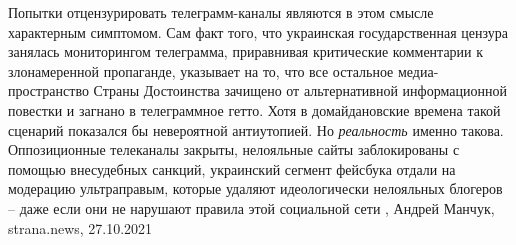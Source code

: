 Попытки отцензурировать телеграмм-каналы являются в этом смысле характерным
симптомом. Сам факт того, что украинская государственная цензура занялась
мониторингом телеграмма, приравнивая критические комментарии к злонамеренной
пропаганде, указывает на то, что все остальное медиа-пространство Страны
Достоинства зачищено от альтернативной информационной повестки и загнано в
телеграммное гетто. Хотя в домайдановские времена такой сценарий показался бы
невероятной антиутопией.  Но \emph{реальность} именно такова. Оппозиционные
телеканалы закрыты, нелояльные сайты заблокированы с помощью внесудебных
санкций, украинский сегмент фейсбука отдали на модерацию ультраправым, которые
удаляют идеологически нелояльных блогеров – даже если они не нарушают правила
этой социальной сети
, 
Андрей Манчук, strana.news, 27.10.2021
